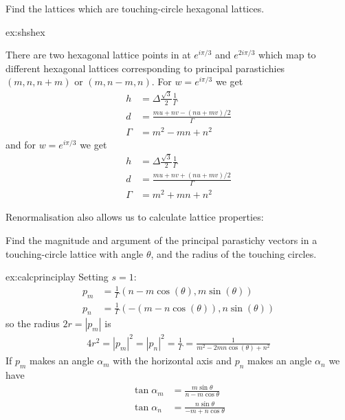 \begin{jExercise}\label{ex:shshex}{
		Find  the  lattices which are touching-circle hexagonal lattices.
}\end{jExercise}
\begin{jAnswer}{ex:shshex}{
There are two hexagonal lattice points in  at $e^{i\pi/3}$ and $e^{2i\pi/3}$ which map to different hexagonal lattices corresponding to principal parastichies  $(m,n,n+m)$ or  $(m,n-m,n)$. For $w= e^{i\pi/3}$ we get
	\begin{align}
	h  &= \Delta\frac{\sqrt{3}}{2} \frac{1}{\Gamma} 
\\
	d &=  \frac{ m u +  n v- (n u + mv)/2   }{\Gamma}
	\\
	\Gamma &= m^2-m n+n^2
	\end{align}
	and for  $w= e^{i\pi/3}$  we get 
		\begin{align}
		h  &= \Delta\frac{\sqrt{3}}{2} \frac{1}{\Gamma} 
		\\
		d &=  \frac{ m u +  n v+ (n u + mv)/2   }{\Gamma}
		\\
		\Gamma &= m^2+m n+n^2
	\end{align}
	
}
\end{jAnswer}
Renormalisation also allows us to calculate lattice properties:
\begin{jExercise}\label{ex:calcprinciplay}{
		Find the magnitude and argument of the principal parastichy vectors in a touching-circle   lattice with angle $\theta$, and the radius of the touching circles.
}\end{jExercise}
\begin{jAnswer}{ex:calcprinciplay}{
	Setting $s=1$:
	\begin{align}
		p_m &= \frac{1}{\Gamma}\left(n-m  \cos (\theta ),m  \sin (\theta ) \right) 
		\label{eq:tcpm}
		\\
		p_n&= \frac{1}{\Gamma}\left(- (m -n \cos (\theta )),n  \sin (\theta) \right) 
	\label{eq:tcpn} 
	\end{align}
	so the radius $2r=|p_m|$ is 
		\begin{align}
	4r^2=	|p_m|^2=|p_n|^2= \frac{1}{\Gamma}=\frac{1}{m^2 -2 m n  \cos (\theta )+n^2}
		\label{eq:tcmod}
			\end{align}
If $p_m$ makes an angle $\alpha_m$ with the horizontal axis and $p_n$ makes an angle $\alpha_n$
we have
	\begin{align}
	\tan \alpha_m &= \frac{m  \sin \theta }{n-m  \cos \theta } 
	\label{eq:tcpm}
	\\
	\tan \alpha_n&= \frac{n  \sin \theta}{- m +n \cos \theta }
	\label{eq:tcpn} 
\end{align}
	}
\end{jAnswer}




